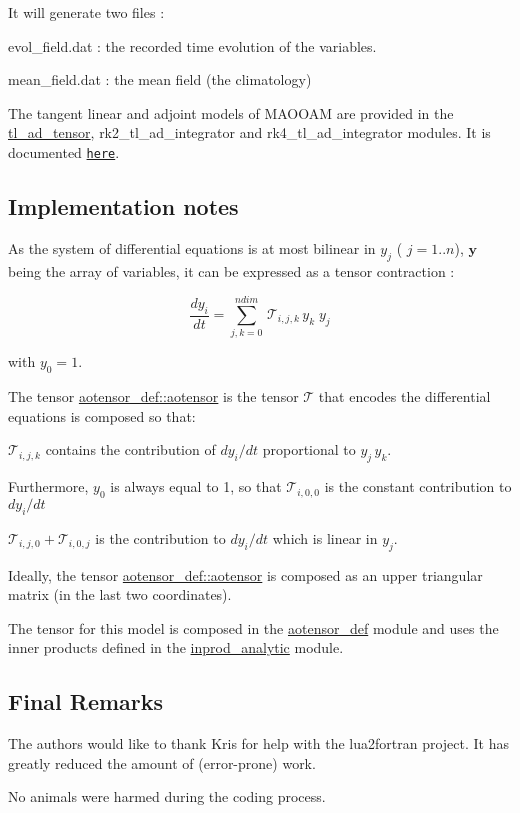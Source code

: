 It will generate two files \+:
\begin{DoxyItemize}
\item evol\+\_\+field.\+dat \+: the recorded time evolution of the variables.
\item mean\+\_\+field.\+dat \+: the mean field (the climatology)
\end{DoxyItemize}

The tangent linear and adjoint models of M\+A\+O\+O\+AM are provided in the \hyperlink{namespacetl__ad__tensor}{tl\+\_\+ad\+\_\+tensor}, rk2\+\_\+tl\+\_\+ad\+\_\+integrator and rk4\+\_\+tl\+\_\+ad\+\_\+integrator modules. It is documented \href{./md_doc_tl_ad_doc.html}{\tt here}.





\subsection*{Implementation notes}

As the system of differential equations is at most bilinear in $y_j$ ( $j=1..n$), $\boldsymbol{y}$ being the array of variables, it can be expressed as a tensor contraction \+:

\[ \frac{d y_i}{dt} = \sum_{j,k=0}^{ndim} \, \mathcal{T}_{i,j,k} \, y_k \; y_j \]

with $y_0 = 1$.

The tensor \hyperlink{namespaceaotensor__def_a0dc43bc9294a18f2fe57b67489f1702f}{aotensor\+\_\+def\+::aotensor} is the tensor $\mathcal{T}$ that encodes the differential equations is composed so that\+:


\begin{DoxyItemize}
\item $\mathcal{T}_{i,j,k}$ contains the contribution of $dy_i/dt$ proportional to $ y_j \, y_k$.
\item Furthermore, $y_0$ is always equal to 1, so that $\mathcal{T}_{i,0,0}$ is the constant contribution to $dy_i/dt$
\item $\mathcal{T}_{i,j,0} + \mathcal{T}_{i,0,j}$ is the contribution to $dy_i/dt$ which is linear in $y_j$.
\end{DoxyItemize}

Ideally, the tensor \hyperlink{namespaceaotensor__def_a0dc43bc9294a18f2fe57b67489f1702f}{aotensor\+\_\+def\+::aotensor} is composed as an upper triangular matrix (in the last two coordinates).

The tensor for this model is composed in the \hyperlink{namespaceaotensor__def}{aotensor\+\_\+def} module and uses the inner products defined in the \hyperlink{namespaceinprod__analytic}{inprod\+\_\+analytic} module.





\subsection*{Final Remarks}

The authors would like to thank Kris for help with the lua2fortran project. It has greatly reduced the amount of (error-\/prone) work.

No animals were harmed during the coding process. 